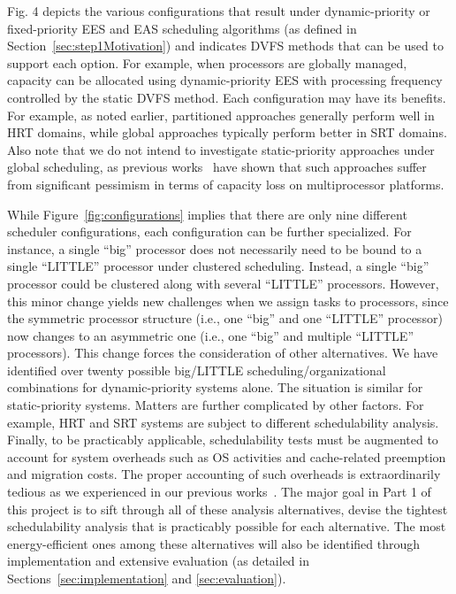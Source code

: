 Fig. 4 depicts the various configurations that result under dynamic-priority or fixed-priority EES and EAS scheduling algorithms (as defined in Section~\ref{sec:step1Motivation}) and indicates DVFS methods that can be used to support each option. For example, when processors are globally managed, capacity can be allocated using dynamic-priority EES with processing frequency controlled by the static DVFS method.  
 Each configuration may have its benefits. For example, as noted earlier, partitioned approaches generally perform well in HRT domains, while global approaches typically perform better in SRT domains. Also note that we do not intend to investigate static-priority approaches under global scheduling, as previous works~\cite{?} have shown that such approaches suffer from significant pessimism in terms of capacity loss on multiprocessor platforms.

While  Figure~\ref{fig:configurations} implies that there are only nine different scheduler configurations, each configuration can be further specialized. For instance, a single ``big'' processor does not necessarily need to be bound to a single ``LITTLE'' processor under clustered scheduling. Instead, a single ``big'' processor could be clustered along with several ``LITTLE'' processors. However, this minor change yields new challenges when we assign tasks to processors, since the symmetric processor structure (i.e., one ``big'' and one ``LITTLE'' processor) now changes to an asymmetric one (i.e., one ``big'' and multiple ``LITTLE'' processors). This change forces the consideration of other alternatives. We have identified over twenty possible big/LITTLE scheduling/organizational combinations for dynamic-priority systems alone. The situation is similar for static-priority systems. Matters are further complicated by other factors. For example, HRT and SRT systems are subject to different schedulability analysis. Finally, to be practicably applicable, schedulability tests must be augmented to account for system overheads such as OS activities and cache-related preemption and migration costs. %
 The proper accounting of such overheads is extraordinarily tedious as we experienced in our previous works~\cite{?}. The major goal in Part 1 of this project is to sift through all of these analysis alternatives, devise the tightest schedulability analysis that is practicably possible for each alternative. The most energy-efficient ones among these alternatives will also be identified through implementation and extensive evaluation (as detailed in Sections~\ref{sec:implementation} and \ref{sec:evaluation}). 

